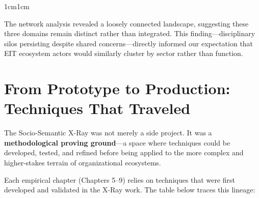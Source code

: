 \documentclass[../main.tex]{subfiles}
\begin{document}
\begin{adjustwidth}{1cm}{1cm}


The network analysis revealed a loosely connected landscape, suggesting these three domains remain distinct rather than integrated. This finding---disciplinary silos persisting despite shared concerns---directly informed our expectation that EIT ecosystem actors would similarly cluster by sector rather than function.

\vspace{0.8cm}

\section*{From Prototype to Production: Techniques That Traveled}

The Socio-Semantic X-Ray was not merely a side project. It was a \textbf{methodological proving ground}---a space where techniques could be developed, tested, and refined before being applied to the more complex and higher-stakes terrain of organizational ecosystems.


Each empirical chapter (Chapters 5--9) relies on techniques that were first developed and validated in the X-Ray work. The table below traces this lineage:


\end{adjustwidth}
\end{document}
